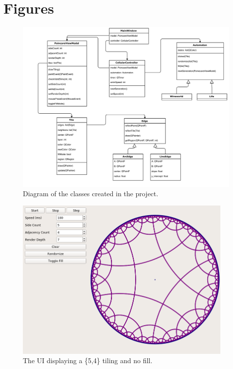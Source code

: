 \documentclass[letterpaper,12pt]{article}
\begin{document}
\section*{Figures}
\begin{figure}[H]
\hspace{-10em}\includegraphics[width=\paperwidth]{../media/class_diagram.png}
\caption{Diagram of the classes created in the project.}
\centering
\end{figure}

\begin{figure}[H]
\vspace{-5em}\includegraphics[width=29em]{../media/ui1.png}
\caption{The UI displaying a \{5,4\} tiling and no fill.}
\centering
\end{figure}
\end{document}
